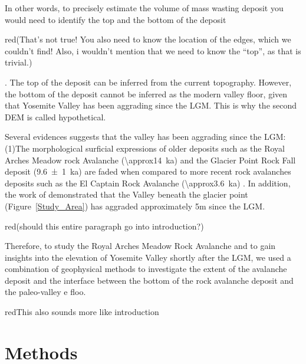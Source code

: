 \documentclass[5p]{elsarticle}
\newcommand{\alon}{\begin{color}{red}}
\newcommand{\aloff}{\end{color}}
\begin{document}
In other words, to precisely estimate the volume of mass wasting deposit you would need to identify the top and the bottom of the deposit \alon(That's not true! You also need to know the location of the edges, which we couldn't find! Also, i wouldn't mention that we need to know the ``top'', as that is trivial.)\aloff. The top of the deposit can be inferred from the current topography. However, the bottom of the deposit cannot be inferred as the modern valley floor, given that Yosemite Valley has been aggrading since the LGM. This is why the second DEM is called hypothetical.


Several evidences suggests that the valley has been aggrading since the LGM: (1)The morphological surficial expressions of older deposits such as the Royal Arches Meadow rock Avalanche (\SI{\approx14}{\kilo a}) and the Glacier Point Rock Fall deposit (\SI{9.6 \pm 1}{\kilo a}) \citep{cordes2013supporting} are faded when compared to more recent rock avalanches deposits such as the El Captain Rock Avalanche (\SI{\approx3.6}{\kilo a}) \citep{stock2010catastrophic}. In addition, the work of \cite{cordes2013supporting} demonstrated that the Valley beneath the glacier point (Figure~\ref{Study_Area}) has aggraded approximately 5m since the LGM. \alon(should this entire paragraph go into introduction?)\aloff

Therefore, to study the Royal Arches Meadow Rock Avalanche and to gain insights into the elevation of Yosemite Valley shortly after the LGM, we used a combination of geophysical methods to investigate the extent of the avalanche deposit and the interface between the bottom of the rock avalanche deposit and the paleo-valley e floo. \alon This also sounds more like introduction \aloff



\section{Methods}
\end{document}
